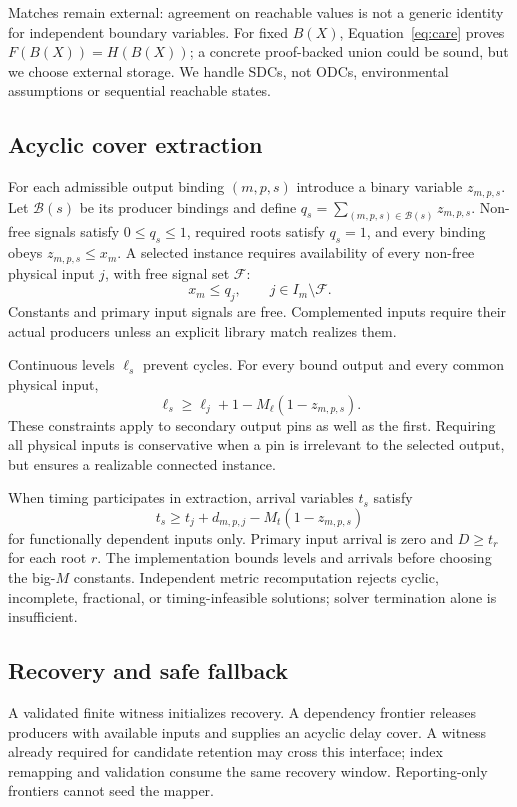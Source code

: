 \documentclass[conference]{IEEEtran}
\begin{document}
Matches remain external: agreement on reachable values is not a generic
identity for independent boundary variables. For fixed $B(X)$,
Equation~\eqref{eq:care} proves $F(B(X))=H(B(X))$; a concrete proof-backed
union could be sound, but we choose external storage. We handle SDCs,
not ODCs, environmental assumptions or sequential reachable states.

\subsection{Acyclic cover extraction}
For each admissible output binding $(m,p,s)$ introduce a binary variable
$z_{m,p,s}$. Let $\mathcal{B}(s)$ be its producer bindings and define
$q_s=\sum_{(m,p,s)\in\mathcal{B}(s)}z_{m,p,s}$. Non-free signals satisfy
$0\leq q_s\leq1$, required roots satisfy $q_s=1$, and every binding obeys
$z_{m,p,s}\leq x_m$. A selected instance requires availability of every
non-free physical input $j$, with free signal set $\mathcal{F}$:
\begin{equation}
 x_m\leq q_j,\qquad j\in I_m\setminus\mathcal{F}.
\end{equation}
Constants and primary input signals are free. Complemented inputs require
their actual producers unless an explicit library match realizes them.

Continuous levels $\ell_s$ prevent cycles. For every bound output and
every common physical input,
\begin{equation}
 \ell_s\geq\ell_j+1-M_\ell(1-z_{m,p,s}).
 \label{eq:acyclic}
\end{equation}
These constraints apply to secondary output pins as well as the first.
Requiring all physical inputs is conservative when a pin is irrelevant
to the selected output, but ensures a realizable connected instance.

When timing participates in extraction, arrival variables $t_s$ satisfy
\begin{equation}
 t_s\geq t_j+d_{m,p,j}-M_t(1-z_{m,p,s})
\end{equation}
for functionally dependent inputs only. Primary input arrival is zero and
$D\geq t_r$ for each root $r$. The implementation bounds levels and
arrivals before choosing the big-$M$ constants. Independent metric
recomputation rejects cyclic, incomplete, fractional, or timing-infeasible
solutions; solver termination alone is insufficient.

\subsection{Recovery and safe fallback}
A validated finite witness initializes recovery. A dependency frontier
releases producers with available inputs and supplies an acyclic delay
cover. A witness already required for candidate retention may cross this
interface; index remapping and validation consume the same recovery
window. Reporting-only frontiers cannot seed the mapper.
\end{document}

